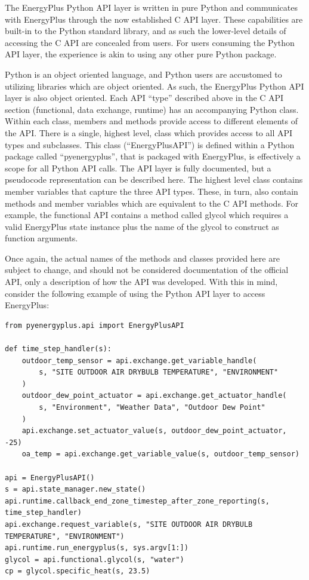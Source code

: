 \documentclass[5p]{elsarticle}
\begin{document}
The EnergyPlus Python API layer is written in pure Python and communicates with EnergyPlus through the now established C API layer.  These capabilities are built-in to the Python standard library, and as such the lower-level details of accessing the C API are concealed from users.  For users consuming the Python API layer, the experience is akin to using any other pure Python package.

Python is an object oriented language, and Python users are accustomed to utilizing libraries which are object oriented.  As such, the EnergyPlus Python API layer is also object oriented.  Each API “type” described above in the C API section (functional, data exchange, runtime) has an accompanying Python class.  Within each class, members and methods provide access to different elements of the API.  There is a single, highest level, class which provides access to all API types and subclasses.  This class (“EnergyPlusAPI”) is defined within a Python package called “pyenergyplus”, that is packaged with EnergyPlus, is effectively a scope for all Python API calls.  The API layer is fully documented, but a pseudocode representation can be described here.  The highest level class contains member variables that capture the three API types.  These, in turn, also contain methods and member variables which are equivalent to the C API methods.  For example, the functional API contains a method called glycol which requires a valid EnergyPlus state instance plus the name of the glycol to construct as function arguments.

Once again, the actual names of the methods and classes provided here are subject to change, and should not be considered documentation of the official API, only a description of how the API was developed.  With this in mind, consider the following example of using the Python API layer to access EnergyPlus:

\lstset{language=python}
\begin{lstlisting}
from pyenergyplus.api import EnergyPlusAPI

def time_step_handler(s):
    outdoor_temp_sensor = api.exchange.get_variable_handle(
        s, "SITE OUTDOOR AIR DRYBULB TEMPERATURE", "ENVIRONMENT"
    )
    outdoor_dew_point_actuator = api.exchange.get_actuator_handle(
        s, "Environment", "Weather Data", "Outdoor Dew Point"
    )
    api.exchange.set_actuator_value(s, outdoor_dew_point_actuator, -25)
    oa_temp = api.exchange.get_variable_value(s, outdoor_temp_sensor)

api = EnergyPlusAPI()
s = api.state_manager.new_state()
api.runtime.callback_end_zone_timestep_after_zone_reporting(s, time_step_handler)
api.exchange.request_variable(s, "SITE OUTDOOR AIR DRYBULB TEMPERATURE", "ENVIRONMENT")
api.runtime.run_energyplus(s, sys.argv[1:])
glycol = api.functional.glycol(s, "water")
cp = glycol.specific_heat(s, 23.5)
\end{lstlisting}
\end{document}
